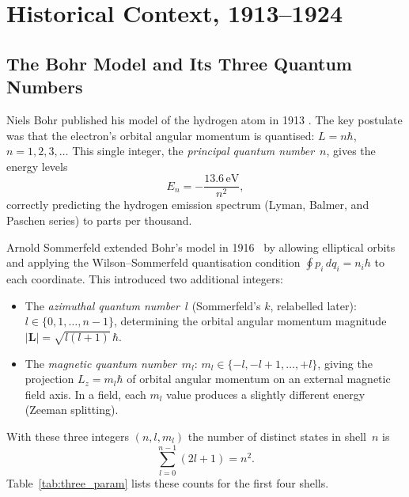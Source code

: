 \documentclass[12pt]{article}
\begin{document}
\section{Historical Context, 1913--1924}
\label{sec:history}

\subsection{The Bohr Model and Its Three Quantum Numbers}

Niels Bohr published his model of the hydrogen atom in 1913
\citep{Bohr1913}.  The key postulate was that the electron's orbital angular
momentum is quantised: $L = n\hbar$, $n=1,2,3,\ldots$  This single integer,
the \emph{principal quantum number}~$n$, gives the energy levels
\begin{equation}\label{eq:bohr}
  E_n = -\frac{13.6\,\text{eV}}{n^2},
\end{equation}
correctly predicting the hydrogen emission spectrum (Lyman, Balmer, and
Paschen series) to parts per thousand.

Arnold Sommerfeld extended Bohr's model in 1916~\citep{Sommerfeld1916} by
allowing elliptical orbits and applying the Wilson--Sommerfeld quantisation
condition $\oint p_i\,dq_i = n_i h$ to each coordinate.  This introduced two
additional integers:
\begin{itemize}
  \item The \emph{azimuthal quantum number}~$l$ (Sommerfeld's $k$,
    relabelled later): $l\in\{0,1,\ldots,n-1\}$, determining the orbital
    angular momentum magnitude $|\mathbf{L}| = \sqrt{l(l+1)}\,\hbar$.
  \item The \emph{magnetic quantum number}~$m_l$: $m_l\in\{-l,-l{+}1,\ldots,
    +l\}$, giving the projection $L_z = m_l\hbar$ of orbital angular momentum
    on an external magnetic field axis.  In a field, each $m_l$ value produces
    a slightly different energy (Zeeman splitting).
\end{itemize}

With these three integers $(n,l,m_l)$ the number of distinct states in shell~$n$
is
\begin{equation}\label{eq:three_count}
  \sum_{l=0}^{n-1}(2l+1) = n^2.
\end{equation}
Table~\ref{tab:three_param} lists these counts for the first four shells.
\end{document}
